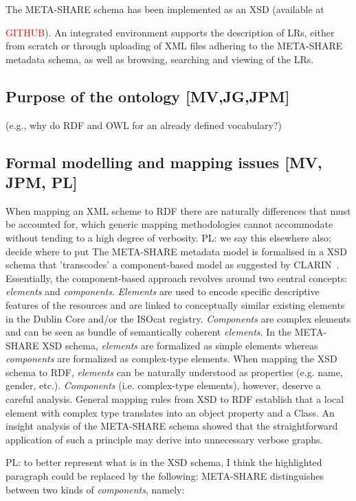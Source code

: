 \documentclass{llncs}
\begin{document}
The META-SHARE schema has been implemented as an XSD (available at {\textcolor{red}{GITHUB}). An integrated environment supports the description of LRs, either from scratch or through uploading of XML files adhering to the META-SHARE metadata schema, as well as browsing, searching and viewing of the LRs.
\subsection{Purpose of the ontology [MV,JG,JPM]}
\label{sec:purpose}
(e.g., why do RDF and OWL for an already defined vocabulary?)
\subsection{Formal modelling and mapping issues [MV, JPM, PL]}
When mapping an XML scheme to RDF there are naturally differences that must be
accounted for, which generic mapping methodologies cannot accommodate without
tending to a high degree of verbosity.
{PL: we say this elsewhere also; decide where to put}
The META-SHARE metadata model is formalised in a XSD schema that 'transcodes' a component-based model as suggested by CLARIN~\cite{broeder2012cmdi}. Essentially, the component-based approach revolves around two central concepts: \emph{elements} and \emph{components}. \emph{Elements} are used to encode specific descriptive features of the resources and are linked to conceptually similar existing elements in the Dublin Core and/or the ISOcat registry. \emph{Components} are complex elements and can be seen as bundle of semantically coherent \emph{elements}.
In the META-SHARE XSD schema, \emph{elements} are formalized as simple elements whereas \emph{components} are formalized as complex-type elements. When mapping the XSD schema to RDF, \emph{elements} can be naturally understood as properties (e.g. name, gender, etc.). \emph{Components} (i.e. complex-type elements), however, deserve a careful analysis. General mapping rules from XSD to RDF establish that a local element with complex type translates into an object property and a Class. An insight analysis of the META-SHARE schema showed that the straightforward application of such a principle may derive into unnecessary verbose graphs.
{PL: to better represent what is in the XSD schema, I think the highlighted paragraph could be replaced by the following:
META-SHARE distinguishes between two kinds of \emph{components}, namely:
\begin{itemize}

\end{itemize}}}
\end{document}
